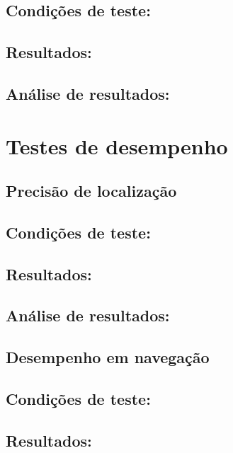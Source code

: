 \subsection*{\textbf{Condições de teste:}}

\subsection*{\textbf{Resultados:}}  

\subsection*{\textbf{Análise de resultados:}}


\section{\textbf{Testes de desempenho}}

\subsection{Precisão de localização}

\subsection*{\textbf{Condições de teste:}}

\subsection*{\textbf{Resultados:}}  

\subsection*{\textbf{Análise de resultados:}}


\subsection{Desempenho em navegação}

\subsection*{\textbf{Condições de teste:}}

\subsection*{\textbf{Resultados:}}  

